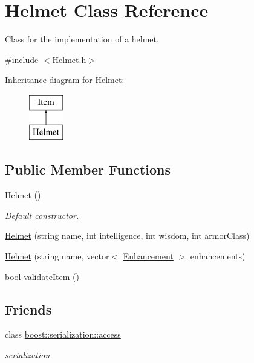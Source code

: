 \hypertarget{class_helmet}{}\section{Helmet Class Reference}
\label{class_helmet}


Class for the implementation of a helmet.  




{\ttfamily \#include $<$Helmet.\+h$>$}

Inheritance diagram for Helmet\+:\begin{figure}[H]
\begin{center}
\leavevmode
\includegraphics[height=2.000000cm]{class_helmet}
\end{center}
\end{figure}
\subsection*{Public Member Functions}
\begin{DoxyCompactItemize}
\item 
\hypertarget{class_helmet_ae9f39c8ca82962c770f9907123e663f5}{}\label{class_helmet_ae9f39c8ca82962c770f9907123e663f5} 
\hyperlink{class_helmet_ae9f39c8ca82962c770f9907123e663f5}{Helmet} ()
\begin{DoxyCompactList}\small\item\em Default constructor. \end{DoxyCompactList}\item 
\hyperlink{class_helmet_a527f044873f7a81dfcd6df549ba6e25d}{Helmet} (string name, int intelligence, int wisdom, int armor\+Class)
\item 
\hyperlink{class_helmet_a9d7a5c9a98e83c6a24545261aabcf120}{Helmet} (string name, vector$<$ \hyperlink{class_enhancement}{Enhancement} $>$ enhancements)
\item 
bool \hyperlink{class_helmet_aa840a7be0b69b5b3d60398c22d00537f}{validate\+Item} ()
\end{DoxyCompactItemize}
\subsection*{Friends}
\begin{DoxyCompactItemize}
\item 
\hypertarget{class_helmet_ac98d07dd8f7b70e16ccb9a01abf56b9c}{}\label{class_helmet_ac98d07dd8f7b70e16ccb9a01abf56b9c} 
class \hyperlink{class_helmet_ac98d07dd8f7b70e16ccb9a01abf56b9c}{boost\+::serialization\+::access}
\begin{DoxyCompactList}\small\item\em serialization \end{DoxyCompactList}\end{DoxyCompactItemize}
